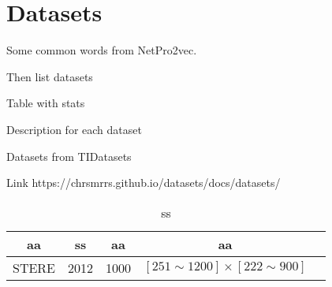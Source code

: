 \section{Datasets}


Some common words from NetPro2vec.

Then list datasets

Table with stats

Description for each dataset

Datasets from TIDatasets \cite{TUDataset}

Link https://chrsmrrs.github.io/datasets/docs/datasets/


\begin{center}
    \begin{table}
        \begin{tabular}{|c|c|c|c|c|}
            \hline
            aa & ss & aa & aa\\
            \hline
            \hline
            STERE & 2012 & 1000 & $[251 \sim 1200] \times [222 \sim 900]$ \\
            \hline

            \hline
        \end{tabular}
    \caption{ss}
    \label{tab:datasets}
    \end{table}
\end{center}

